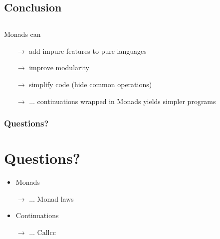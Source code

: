 \documentclass{beamer}
\begin{document}

\begin{frame}[fragile]
\section{Conclusion}
\subsection{}
Monads can
\begin{itemize}
\item[$\rightarrow$] add impure features to pure languages
\item[$\rightarrow$] improve modularity
\item[$\rightarrow$] simplify code (hide common operations)
\item[$\rightarrow$] $\dots$ continuations wrapped in Monads yields
  simpler programs
\end{itemize}
\end{frame}


\begin{frame}
\frametitle{Questions?}
\section{Questions?}
\begin{itemize}
\item Monads
\item[$\rightarrow$] $\dots$ Monad laws
\item Continuations
\item[$\rightarrow$] $\dots$ Callcc
\end{itemize}
\end{frame}
\end{document}
